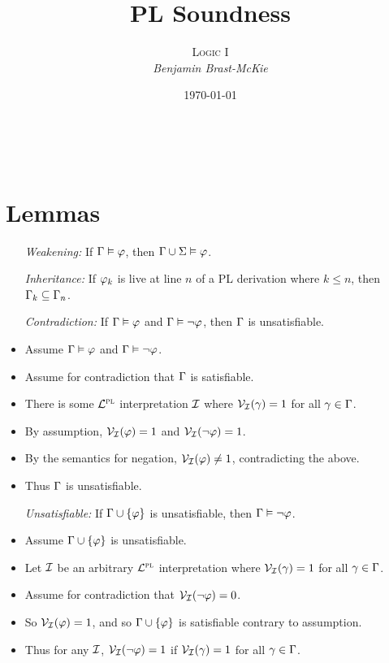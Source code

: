 \documentclass[a4paper, 11pt]{article} %
\title{\textbf{PL Soundness}} %
\author{\textsc{Logic I}\\ \em Benjamin Brast-McKie} %
\date{\today} %
\makeatletter
\renewcommand{\maketitle}{
\begin{flushright}
{\LARGE\@title}

\vspace{10pt}

{\@author}
\\ \@date
\end{flushright}

\vspace{-20pt}

}
\makeatother
\begin{document}
\maketitle %

\thispagestyle{empty}


\section*{Lemmas}

\begin{itemize}
  \item[\it Weakening:] If $\Gamma \vDash \varphi$, then $\Gamma \cup \Sigma \vDash \varphi$.
  \item[\it Inheritance:] If $\varphi_k$ is live at line $n$ of a PL derivation where $k\leq n$, then $\Gamma_k\subseteq \Gamma_n$.
  \item[\it Contradiction:] If $\Gamma \vDash \varphi$ and $\Gamma \vDash \neg\varphi$, then $\Gamma$ is unsatisfiable.
    \item Assume $\Gamma \vDash \varphi$ and $\Gamma \vDash \neg\varphi$.
    \item Assume for contradiction that $\Gamma$ is satisfiable. 
    \item There is some $\mathcal{L}^{\textsc{pl}}$ interpretation $\mathcal{I}$ where $\mathcal{V}_{\mathcal{I}}(\gamma) = 1$ for all $\gamma \in \Gamma$.
    \item By assumption, $\mathcal{V}_{\mathcal{I}}(\varphi) = 1$ and $\mathcal{V}_{\mathcal{I}}(\neg \varphi) = 1$.
    \item By the semantics for negation, $\mathcal{V}_{\mathcal{I}}(\varphi) \neq 1$, contradicting the above.
    \item Thus $\Gamma$ is unsatisfiable. 
  \item[\it Unsatisfiable:] If $\Gamma \cup \lbrace\varphi\rbrace$ is unsatisfiable, then $\Gamma \vDash \neg\varphi$.
    \item Assume $\Gamma \cup \lbrace\varphi\rbrace$ is unsatisfiable.
    \item Let $\mathcal{I}$ be an arbitrary $\mathcal{L}^{\textsc{pl}}$ interpretation where $\mathcal{V}_{\mathcal{I}}(\gamma) = 1$ for all $\gamma \in \Gamma$. 
    \item Assume for contradiction that $\mathcal{V}_{\mathcal{I}}(\neg \varphi) = 0$.
    \item So $\mathcal{V}_{\mathcal{I}}(\varphi) = 1$, and so $\Gamma \cup \lbrace\varphi\rbrace$ is satisfiable contrary to assumption.
    \item Thus for any $\mathcal{I}$, $\mathcal{V}_{\mathcal{I}}(\neg \varphi) = 1$ if $\mathcal{V}_{\mathcal{I}}(\gamma) = 1$ for all $\gamma \in \Gamma$.

\end{itemize}
\end{document}
